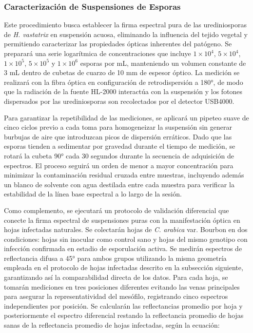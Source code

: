 \documentclass[12pt, a4paper]{article}
\begin{document}
	\subsubsection{Caracterización de Suspensiones de Esporas}
	
	Este procedimiento busca establecer la firma espectral pura de las urediniosporas de \textit{H. vastatrix} en suspensión acuosa, eliminando la influencia del tejido vegetal y permitiendo caracterizar las propiedades ópticas inherentes del patógeno. Se preparará una serie logarítmica de concentraciones que incluye $1\times10^4$, $5\times10^4$, $1\times10^5$, $5\times10^5$ y $1\times10^6$ esporas por mL, manteniendo un volumen constante de 3 mL dentro de cubetas de cuarzo de 10 mm de espesor óptico. La medición se realizará con la fibra óptica en configuración de retrodispersión a 180°, de modo que la radiación de la fuente HL-2000 interactúa con la suspensión y los fotones dispersados por las urediniosporas son recolectados por el detector USB4000.
	
	Para garantizar la repetibilidad de las mediciones, se aplicará un pipeteo suave de cinco ciclos previo a cada toma para homogeneizar la suspensión sin generar burbujas de aire que introduzcan picos de dispersión erráticos. Dado que las esporas tienden a sedimentar por gravedad durante el tiempo de medición, se rotará la cubeta 90° cada 30 segundos durante la secuencia de adquisición de espectros. El proceso seguirá un orden de menor a mayor concentración para minimizar la contaminación residual cruzada entre muestras, incluyendo además un blanco de solvente con agua destilada entre cada muestra para verificar la estabilidad de la línea base espectral a lo largo de la sesión.
	
	Como complemento, se ejecutará un protocolo de validación diferencial que conecte la firma espectral de suspensiones puras con la manifestación óptica en hojas infectadas naturales. Se colectarán hojas de \textit{C. arabica} var. Bourbon en dos condiciones: hojas sin inocular como control sano y hojas del mismo genotipo con infección confirmada en estadio de esporulación activa. Se medirán espectros de reflectancia difusa a 45° para ambos grupos utilizando la misma geometría empleada en el protocolo de hojas infectadas descrito en la subsección siguiente, garantizando así la comparabilidad directa de los datos. Para cada hoja, se tomarán mediciones en tres posiciones diferentes evitando las venas principales para asegurar la representatividad del mesófilo, registrando cinco espectros independientes por posición. Se calcularán las reflectancias promedio por hoja y posteriormente el espectro diferencial restando la reflectancia promedio de hojas sanas de la reflectancia promedio de hojas infectadas, según la ecuación:
	
\end{document}
